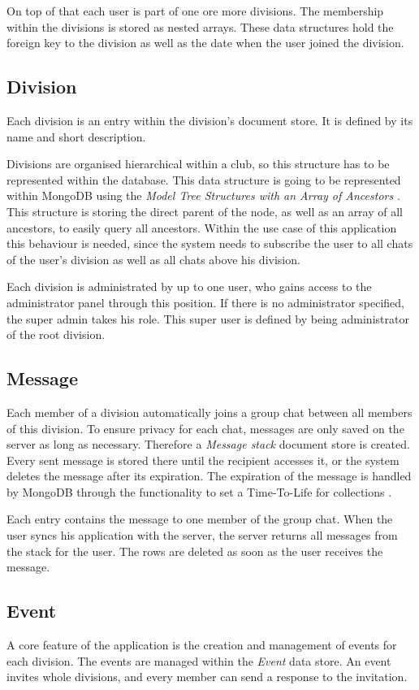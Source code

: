 On top of that each user is part of one ore more divisions. The membership within the divisions is stored as nested arrays. These data structures hold the foreign key to the division as well as the date when the user joined the division.

\subsection{Division}
Each division is an entry within the division's document store. It is defined by its name and short description.

Divisions are organised hierarchical within a club, so this structure has to be represented within the database. This data structure is going to be represented within MongoDB using the \emph{Model Tree Structures with an Array of Ancestors} \cite[p. 149]{Mongo:2014aa}. This structure is storing the direct parent of the node, as well as an array of all ancestors, to easily query all ancestors. Within the use case of this application this behaviour is needed, since the system needs to subscribe the user to all chats of the user's division as well as all chats above his division.

Each division is administrated by up to one user, who gains access to the administrator panel through this position. If there is no administrator specified, the super admin takes his role. This super user is defined by being administrator of the root division.

\subsection{Message}
Each member of a division automatically joins a group chat between all members of this division. To ensure privacy for each chat, messages are only saved on the server as long as necessary. Therefore a \emph{Message stack} document store is created. Every sent message is stored there until the recipient accesses it, or the system deletes the message after its expiration. The expiration of the message is handled by MongoDB through the functionality to set a Time-To-Life for collections \cite[p. 198]{Mongo:2014aa}.

Each entry contains the message to one member of the group chat. When the user syncs his application with the server, the server returns all messages from the stack for the user. The rows are deleted as soon as the user receives the message. 

\subsection{Event}
A core feature of the application is the creation and management of events for each division. The events are managed within the \emph{Event} data store. An event invites whole divisions, and every member can send a response to the invitation. 

